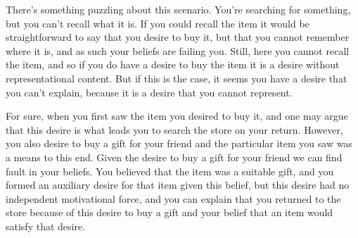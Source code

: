 \documentclass[10pt]{article}
\begin{document}
There's something puzzling about this scenario.
You're searching for something, but you can't recall what it is.
If you could recall the item it would be straightforward to say that you desire to buy it, but that you cannot remember where it is, and as such your beliefs are failing you.
Still, here you cannot recall the item, and so if you do have a desire to buy the item it is a desire without representational content.
But if this is the case, it seems you have a desire that you can't explain, because it is a desire that you cannot represent.

For sure, when you first saw the item you desired to buy it, and one may argue that this desire is what leads you to search the store on your return.
However, you also desire to buy a gift for your friend and the particular item you saw was a means to this end.
Given the desire to buy a gift for your friend we can find fault in your beliefs.
You believed that the item was a suitable gift, and you formed an auxiliary desire for that item given this belief, but this desire had no independent motivational force, and you can explain that you returned to the store because of this desire to buy a gift and your belief that an item would satisfy that desire.

\end{document}

